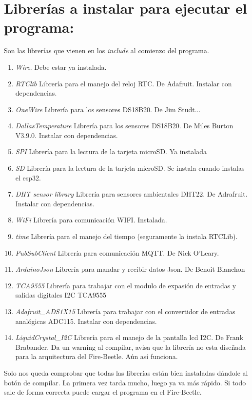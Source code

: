 \section{Librerías a instalar para ejecutar el programa:}
Son las librerías que vienen en los \emph{include} al comienzo del programa.
\begin{enumerate}
\item \emph{Wire}. Debe estar ya instalada.
\item \emph{RTClib} Librería para el manejo del reloj RTC. De Adafruit. Instalar con dependencias.
\item \emph{OneWire} Librería para los sensores DS18B20. De Jim Studt...
\item \emph{DallasTemperature} Librería para los sensores DS18B20. De Miles Burton V3.9.0. Instalar con dependencias.
\item \emph{SPI} Librería para la lectura de la tarjeta microSD. Ya instalada
\item \emph{SD} Librería para la lectura de la tarjeta microSD. Se instala cuando instalas el esp32.
\item \emph{DHT sensor library} Librería para sensores ambientales DHT22. De Adrafruit. Instalar con dependencias.
\item \emph{WiFi} Librería para comunicación WIFI. Instalada.
\item \emph{time} Librería para el manejo del tiempo (seguramente la instala RTCLib). 
\item \emph{PubSubClient} Librería para comunicación MQTT. De Nick O'Leary. 
\item \emph{ArduinoJson} Librería para mandar y recibir datos Json. De Benoit Blanchon
\item \emph{TCA9555} Librería para trabajar con el modulo de expasión de entradas y salidas digitales I2C TCA9555
\item \emph{Adafruit\_ADS1X15} Librería para trabajar con el convertidor de entradas analógicas ADC115. Instalar con dependencias.
\item \emph{LiquidCrystal\_I2C} Librería para el manejo de la pantalla lcd I2C. De Frank Brabander. Da un warning al compilar, avisa que la librería no esta diseñada para la arquitectura del Fire-Beetle. Aún así funciona.
\end{enumerate}

Solo nos queda comprobar que todas las librerías están bien instaladas dándole al botón de compilar. La primera vez tarda mucho, luego ya va más rápido. Si todo sale de forma correcta puede cargar el programa en el Fire-Beetle.

